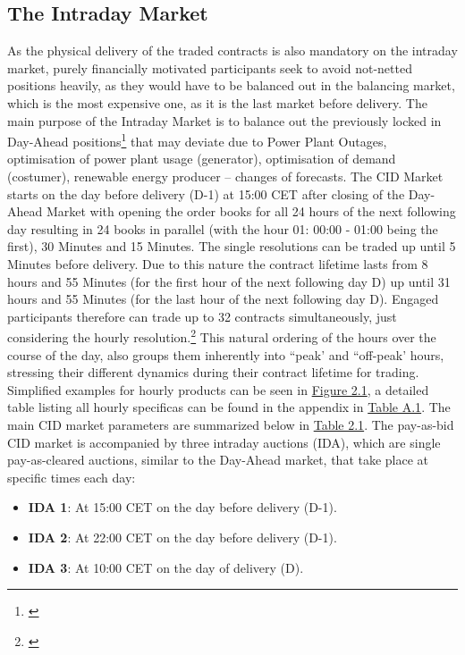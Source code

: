 \documentclass[12pt,a4paper]{cau_thesis}
\begin{document}
\subsection{The Intraday Market}\label{sub_sec:intraday_market}
As the physical delivery of the traded contracts is also mandatory on
the intraday market, purely financially motivated participants seek
to avoid not-netted positions heavily, as they would have to be
balanced out in the balancing market, which is the most expensive
one, as it is the last market before delivery. The main purpose of
the Intraday Market is to balance out the previously locked in
Day-Ahead positions\footnote{\cite[See ][,
        p.238]{balardy2022empirical}} that may deviate due to Power Plant
Outages, optimisation of power plant usage (generator), optimisation
of demand (costumer), renewable energy producer – changes of
forecasts\cite{kiesel_efc16_2016}. The CID Market starts on the day
before delivery (D-1) at 15:00 CET after closing of the Day-Ahead
Market with opening the order books for all 24 hours of the next
following day resulting in 24 books in parallel (with the hour 01:
00:00 - 01:00 being the first), 30 Minutes and 15 Minutes. The single
resolutions can be traded up until 5 Minutes before delivery. Due to
this nature the contract lifetime lasts from 8 hours and 55 Minutes
(for the first hour of the next following day D) up until 31 hours
and 55 Minutes (for the last hour of the next following day D).
Engaged participants therefore can trade up to 32 contracts
simultaneously, just considering the hourly
resolution.\footnote{\cite[See ][, p.234]{balardy2022empirical}} This
natural ordering of the hours over the course of the day, also groups
them inherently into ``peak' and ``off-peak' hours, stressing their
different dynamics during their contract lifetime for trading.
Simplified examples for hourly products can be seen in
\hyperref[fig:european_power_market_design]{Figure 2.1}, a detailed
table listing all hourly specificas can be found in the appendix in
\hyperref[tab:epex_parallel_durations]{Table A.1}. The main CID
market parameters are summarized below in
\hyperref[tab:epex_cid_parameters]{Table 2.1}. The pay-as-bid CID
market is accompanied by three intraday auctions (IDA), which are
single pay-as-cleared auctions, similar to the Day-Ahead market, that
take place at specific times each day:
\begin{itemize}
    \item \textbf{IDA 1}: At 15:00 CET on the day before delivery (D-1).
    \item \textbf{IDA 2}: At 22:00 CET on the day before delivery (D-1).
    \item \textbf{IDA 3}: At 10:00 CET on the day of delivery (D).
\end{itemize}
\end{document}
